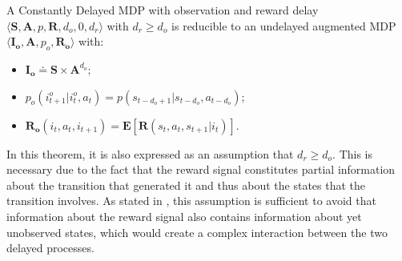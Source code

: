                 \begin{theorem}
                    \label{th:dmdpobsred_v1}
                    A Constantly Delayed MDP with observation and reward delay $\langle \mathbf{S}, \mathbf{A}, p, \mathbf{R}, d_o, 0, d_r \rangle$ with $d_r \geq d_o$ is reducible to an undelayed augmented MDP $\langle \mathbf{I_o}, \mathbf{A}, p_o, \mathbf{R_o} \rangle$ with: 
                    \begin{itemize}[topsep=0.5em, partopsep=0.5em]
                        \setlength\itemsep{0em}
                        \item $\mathbf{I_{o}} \doteq \mathbf{S} \times \mathbf{A}^{d_o}$;
                        \item $p_o \left( i_{t+1}^o | i_t^o , a_t  \right) = p ( s_{t-d_{o}+1} | s_{t-d_{o}}, a_{t-d_{o}})$;
                        \item $\mathbf{R_{o}}\left( i_t, a_{t}, i_{t+1} \right) = \mathbf{E} \left[ \mathbf{R} \left( s_t, a_t, s_{t+1} | i_t \right) \right]$.
                    \end{itemize}
                \end{theorem}
                \noindent
                In this theorem, it is also expressed as an assumption that $d_r \geq d_o$. This is necessary due to the fact that the reward signal constitutes partial information about the transition that generated it and thus about the states that the transition involves. As stated in , this assumption is sufficient to avoid that information about the reward signal also contains information about yet unobserved states, which would create a complex interaction between the two delayed processes.
                
